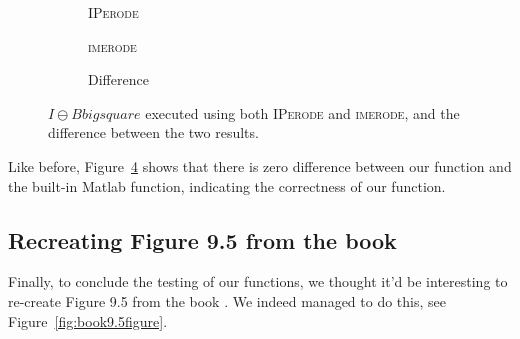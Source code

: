 \documentclass{article}
\begin{document}
\begin{figure}[H]
     \centering
     \begin{subfigure}[b]{0.3\textwidth}
         \centering
         
         \caption{\textsc{IPerode}}
         \label{fig:wirebondmask_Bbigsquare_IPerode}
     \end{subfigure}
     \hfill
     \begin{subfigure}[b]{0.3\textwidth}
         \centering
         
         \caption{\textsc{imerode}}
         \label{fig:wirebondmask_Bbigsquare_imerode}
     \end{subfigure}
     \hfill
     \begin{subfigure}[b]{0.3\textwidth}
         \centering
         
         \caption{Difference}
         \label{fig:wirebondmask_Bbigsquare_erode_diff}
     \end{subfigure}
     
    \caption{$I \ominus Bbigsquare$ executed using both \textsc{IPerode} and \textsc{imerode}, and the difference between the two results.}
    \label{fig:wirebondmask_erode_diff}
\end{figure}

Like before, Figure~\ref{fig:wirebondmask_erode_diff} shows that there is zero difference between our function and the built-in Matlab function, indicating the correctness of our function.

\subsection*{Recreating Figure 9.5 from the book}
Finally, to conclude the testing of our functions, we thought it'd be interesting to re-create Figure 9.5 from the book \citep{gonzalez2008digital}. We indeed managed to do this, see Figure~\ref{fig:book9.5figure}.
\end{document}
